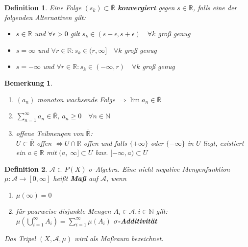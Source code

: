 \documentclass[11pt]{memoir}
\theoremstyle{changebreak}
\newtheorem{Definition}{Definition}[chapter]
\newtheorem{Bemerkung}{Bemerkung}[chapter]
\begin{document}
\begin{Definition}
Eine Folge $(s_{k}) \subset \overline{\mathbb{R}}$ \textbf{konvergiert} gegen $s \in \mathbb{R}$, falls eine der folgenden Alternativen gilt:
\begin{itemize}
	\item  $s \in \mathbb{R}$ und $\forall \epsilon > 0$ gilt $s_{k} \in (s-\epsilon, s+\epsilon) \quad\forall k$ groß genug
	\item $s = \infty$ und $\forall r \in \mathbb{R}: s_{k} \in (r, \infty] \quad \forall k$ groß genug
	\item $s = -\infty$ und $\forall r \in \mathbb{R}: s_k \in (-\infty, r) \quad \forall k$ groß genug
\end{itemize}
\end{Definition}

\begin{Bemerkung}
\begin{enumerate}
	\item $(a_n)$ monoton wachsende Folge
	$\Rightarrow \lim a_n \in \mathbb{\overline{R}}$
	\item $\sum\limits_{n=1}^{\infty} a_n \in \mathbb{\overline{R}}$, $a_n \geq 0 \quad \forall n \in \mathbb{N}$
	\item offene Teilmengen von $\overline{\mathbb{R}}$: \\
	$U \subset \overline{\mathbb{R}} $ offen $\Leftrightarrow U \cap \mathbb{R}$ offen und falls $\{+\infty\}$ oder $\{-\infty\}$ in $U$ liegt, existiert ein $a \in \mathbb{R}$ mit $(a,\; \infty ]\subset U$ bzw. $[-\infty, a) \subset U$
\end{enumerate}
\end{Bemerkung}

\begin{Definition}
$\mathscr{A} \subset P(X)$ $\sigma$-Algebra. Eine nicht negative Mengenfunktion $\mu: \mathscr{A} \rightarrow [0, \infty]$ heißt \textbf{Maß} auf $\mathscr{A}$, wenn
\begin{enumerate}
	\item $\mu(\infty) = 0$
	\item für paarweise disjunkte Mengen $A_i \in \mathscr{A}, i \in \mathbb{N}$ gilt: \\
	$\mu(\bigcup\limits_{i=1}^{\infty}A_i) = \sum\limits_{i=1}^{\infty} \mu(A_i)$ \textbf{$\sigma$-Additivität}
\end{enumerate}
Das Tripel $(X, \mathscr{A}, \mu)$ wird als Maßraum bezeichnet.
\end{Definition}
\end{document}
